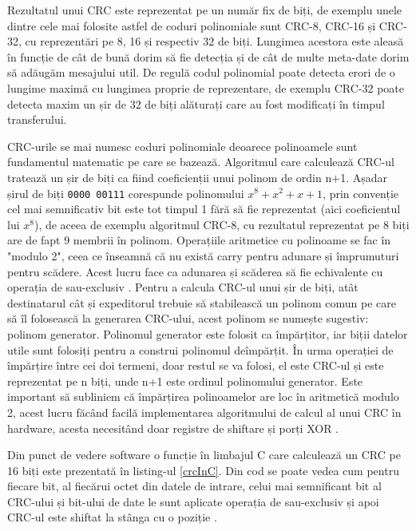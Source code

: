 \documentclass[12pt,a4paper,titlepage]{report}
\begin{document}
Rezultatul unui CRC este reprezentat pe un număr fix de biți, de exemplu unele dintre cele mai folosite astfel de coduri polinomiale sunt CRC-8, CRC-16 și CRC-32, cu reprezentări pe 8, 16 și respectiv 32 de biți. Lungimea acestora este aleasă în funcție de cât de bună dorim să fie detecția și de cât de multe meta-date dorim să adăugăm mesajului util. De regulă codul polinomial poate detecta erori de o lungime maximă cu lungimea proprie de reprezentare, de exemplu CRC-32 poate detecta maxim un șir de 32 de biți alăturați care au fost modificați în timpul transferului.

CRC-urile se mai numesc coduri polinomiale deoarece polinoamele sunt fundamentul matematic pe care se bazează. Algoritmul care calculează CRC-ul tratează un șir de biți ca fiind coeficienții unui polinom de ordin n+1.
Așadar șirul de biți \texttt{0000 00111} corespunde polinomului $x^8 + x^2 + x + 1$, prin convenție cel mai semnificativ bit este tot timpul 1 fără să fie reprezentat (aici coeficientul lui $x^8$), de aceea de exemplu algoritmul CRC-8, cu rezultatul reprezentat pe 8 biți are de fapt 9 membrii în polinom. Operațiile aritmetice cu polinoame se fac în "modulo 2", ceea ce înseamnă că nu există carry pentru adunare și împrumuturi pentru scădere. Acest lucru face ca adunarea și scăderea să fie echivalente cu operația de sau-exclusiv \cite{tanenbaumCN}. Pentru a calcula CRC-ul unui șir de biți, atât destinatarul cât și expeditorul trebuie să stabilească un polinom comun pe care să îl folosească la generarea CRC-ului, acest polinom se numește sugestiv: polinom generator. Polinomul generator este folosit ca împărțitor, iar biții datelor utile sunt folosiți pentru a construi polinomul deîmpărțit. În urma operației de împărțire între cei doi termeni, doar restul se va folosi, el este CRC-ul și este reprezentat pe n biți, unde n+1 este ordinul polinomului generator. Este important să subliniem că împărțirea polinoamelor are loc în aritmetică modulo 2, acest lucru făcând facilă implementarea algoritmului de calcul al unui CRC în hardware, acesta necesitând doar registre de shiftare și porți XOR \cite{hackersDelight}.

Din punct de vedere software o funcție în limbajul C care calculează un CRC pe 16 biți este prezentată în listing-ul \ref{crcInC}. Din cod se poate vedea cum pentru fiecare bit, al fiecărui octet din datele de intrare, celui mai semnificant bit al CRC-ului și bit-ului de date le sunt aplicate operația de sau-exclusiv și apoi CRC-ul este shiftat la stânga cu o poziție \cite{rossCrc}.
\end{document}
